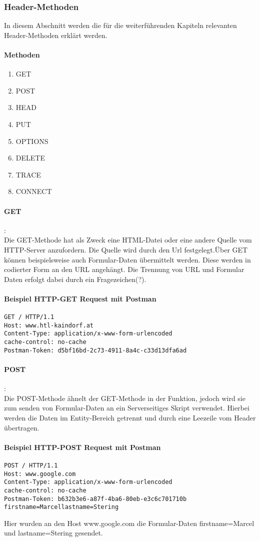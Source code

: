 \subsubsection{Header-Methoden}
In diesem Abschnitt werden die für die weiterführenden Kapiteln relevanten Header-Methoden erklärt werden.
\paragraph{Methoden}
\begin{enumerate}
\item GET
\item POST
\item HEAD
\item PUT
\item OPTIONS
\item DELETE
\item TRACE
\item CONNECT
\end{enumerate}
\paragraph{GET}:\\Die GET-Methode hat als Zweck eine HTML-Datei oder eine andere Quelle vom HTTP-Server anzufordern. Die Quelle wird durch den Url festgelegt.Über GET können beispielsweise auch Formular-Daten übermittelt werden. Diese werden in codierter Form an den URL angehängt. Die Trennung von URL und Formular Daten erfolgt dabei durch ein Fragezeichen(?).
\paragraph{Beispiel HTTP-GET Request mit Postman}
\begin{lstlisting}
GET / HTTP/1.1
Host: www.htl-kaindorf.at
Content-Type: application/x-www-form-urlencoded
cache-control: no-cache
Postman-Token: d5bf16bd-2c73-4911-8a4c-c33d13dfa6ad
\end{lstlisting}
\paragraph{POST}:\\Die POST-Methode ähnelt der GET-Methode in der Funktion, jedoch wird sie zum senden von Formular-Daten an ein Serverseitiges Skript verwendet. Hierbei werden die Daten im Entity-Bereich getrennt und durch eine Leezeile vom Header übertragen.
\paragraph{Beispiel HTTP-POST Request mit Postman}
\begin{lstlisting}
POST / HTTP/1.1
Host: www.google.com
Content-Type: application/x-www-form-urlencoded
cache-control: no-cache
Postman-Token: b632b3e6-a87f-4ba6-80eb-e3c6c701710b
firstname=Marcellastname=Stering
\end{lstlisting}
Hier wurden an den Host www.google.com die Formular-Daten firstname=Marcel und lastname=Stering gesendet.
